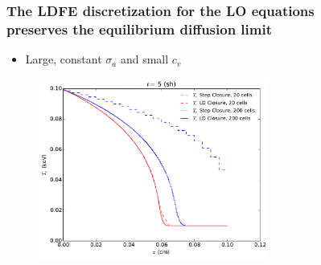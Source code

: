 \documentclass[xcolor=dvipsnames,hyperref={pdfpagelabels=false},unknownkeysallowed]{beamer}
\newcommand{\colG}[1]{{\color{Gray!110} #1}}
\newlength{\wideitemsep}
\let\olditem\item
\renewcommand{\item}{\setlength{\itemsep}{\wideitemsep}\olditem}
\begin{document}
\begin{frame}
    \frametitle{The LDFE discretization for the LO equations \\ preserves the equilibrium diffusion limit}
        \begin{itemize}
            \item \colG{Large, constant $\sigma_a$ and small $c_v$}
        \end{itemize}
\begin{figure}
    \centering
    \includegraphics[width=0.6755799\textwidth]{diff_limit_compare.pdf}
\end{figure}
\end{frame}
\end{document}
